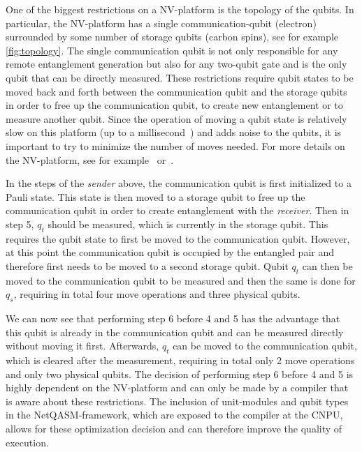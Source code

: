 One of the biggest restrictions on a NV-platform is the topology of the qubits.
In particular, the NV-platform has a single communication-qubit (electron) surrounded by some number of storage qubits (carbon spins), see for example \cref{fig:topology}.
The single communication qubit is not only responsible for any remote entanglement generation but also for any two-qubit gate and is the only qubit that can be directly measured.
These restrictions require qubit states to be moved back and forth between the communication qubit and the storage qubits in order to free up the communication qubit, to create new entanglement or to measure another qubit.
Since the operation of moving a qubit state is relatively slow on this platform (up to a millisecond~\cite{Humphreys2018}) and adds noise to the qubits, it is important to try to minimize the number of moves needed.
For more details on the NV-platform, see for example~\cite{Bernien2014} or~\cite{dahlberg2019linklayer}.

In the steps of the \textit{sender} above, the communication qubit is first initialized to a Pauli state.
This state is then moved to a storage qubit to free up the communication qubit in order to create entanglement with the \textit{receiver}.
Then in step 5, $q_t$ should be measured, which is currently in the storage qubit.
This requires the qubit state to first be moved to the communication qubit.
However, at this point the communication qubit is occupied by the entangled pair and therefore first needs to be moved to a second storage qubit.
Qubit $q_t$ can then be moved to the communication qubit to be measured and then the same is done for $q_s$, requiring in total four move operations and three physical qubits.

We can now see that performing step 6 before 4 and 5 has the advantage that this qubit is already in the communication qubit and can be measured directly without moving it first.
Afterwards, $q_t$ can be moved to the communication qubit, which is cleared after the measurement, requiring in total only 2 move operations and only two physical qubits.
The decision of performing step 6 before 4 and 5 is highly dependent on the NV-platform and can only be made by a compiler that is aware about these restrictions.
The inclusion of unit-modules and qubit types in the \ac{NetQASM}-framework, which are exposed to the compiler at the \ac{CNPU}, allows for these optimization decision and can therefore improve the quality of execution.

